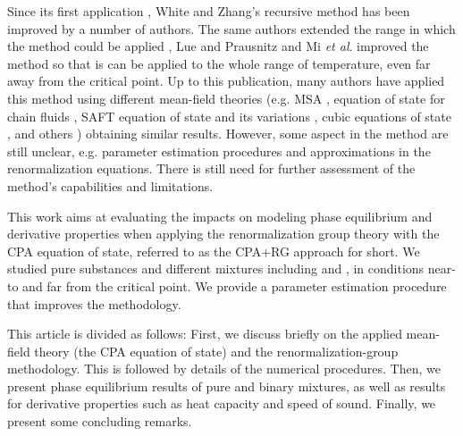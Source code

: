 \documentclass[preprint,12pt,3p]{elsarticle}
\begin{document}
	Since its first application \citep{white1993renormalization}, White and Zhang’s recursive method has been improved by a number of authors. The same authors extended the range in which the method could be applied  \citep{white1998renormalization}, Lue and Prausnitz \cite{lue1998renormalization,lue1998brenormalization} and Mi \textit{et al}.  \cite{mi2004improved} improved the method so that is can be applied to the whole range of temperature, even far away from the critical point. Up to this publication, many authors have applied this method using different mean-field theories (e.g. MSA \citep{lue1998renormalization}, equation of state for chain fluids \cite{jiang1999equation,jiang2000phase}, SAFT equation of state and its variations \cite{llovell2004thermodynamic,forte2011application,bymaster2008renormalization,tang2010renormalization,llovell2006global,forte2013application,dias2009thermodynamic,llovell2006second,llovell2006prediction,llovell2007phase}, cubic equations of state  \cite{xu2011prediction,xu2010crossover,pcm2017application,llovell2008accurate,qiu2006vapor,cai2006vapor,cai2004thermodynamics}, and others  \cite{ghobadi2013renormalization,choi2016renormalization}) obtaining similar results. However, some aspect in the method are still unclear, e.g. parameter estimation procedures and approximations in the renormalization equations. There is still need for further assessment of the method's capabilities and limitations.
	
	This work aims at evaluating the impacts on modeling phase equilibrium and derivative properties when applying the renormalization group theory with the CPA equation of state, referred to as the CPA+RG approach for short. We studied pure substances and different mixtures including  and , in conditions near-to and far from the critical point. We provide a parameter estimation procedure that improves the methodology.
	
	This article is divided as follows: First, we discuss briefly on the applied mean-field theory (the CPA equation of state) and the renormalization-group methodology. This is followed by details of the numerical procedures. Then, we present phase equilibrium results of pure and binary mixtures, as well as results for derivative properties such as heat capacity and speed of sound. Finally, we present some concluding remarks.
\end{document}
